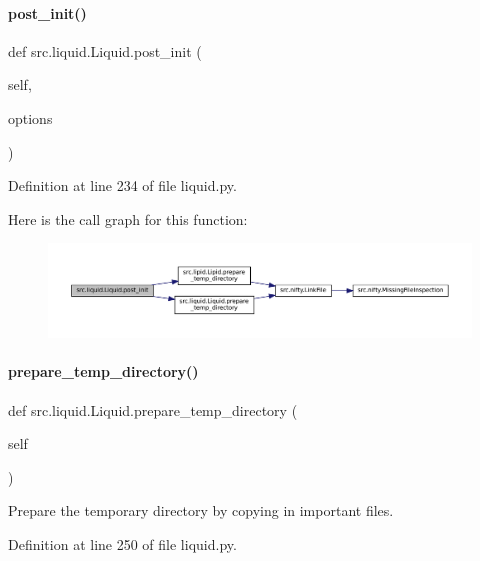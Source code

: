 \paragraph{\texorpdfstring{post\+\_\+init()}{post\_init()}}
{\footnotesize\ttfamily def src.\+liquid.\+Liquid.\+post\+\_\+init (\begin{DoxyParamCaption}\item[{}]{self,  }\item[{}]{options }\end{DoxyParamCaption})}



Definition at line 234 of file liquid.\+py.

Here is the call graph for this function\+:
\nopagebreak
\begin{figure}[H]
\begin{center}
\leavevmode
\includegraphics[width=350pt]{classsrc_1_1liquid_1_1Liquid_a8ded8861b18852faa19ce5193691f1f6_cgraph}
\end{center}
\end{figure}
\mbox{\label{classsrc_1_1liquid_1_1Liquid_a8655401dad963220060fd4dbd4b2c39a}} 
\paragraph{\texorpdfstring{prepare\+\_\+temp\+\_\+directory()}{prepare\_temp\_directory()}}
{\footnotesize\ttfamily def src.\+liquid.\+Liquid.\+prepare\+\_\+temp\+\_\+directory (\begin{DoxyParamCaption}\item[{}]{self }\end{DoxyParamCaption})}



Prepare the temporary directory by copying in important files. 



Definition at line 250 of file liquid.\+py.

